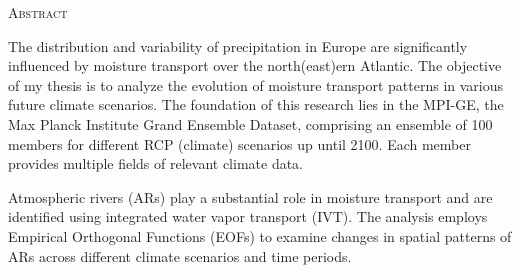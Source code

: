 \begin{center}
  \textsc{Abstract}
\end{center}
%
\noindent
%
The distribution and variability of precipitation in Europe are significantly influenced by moisture transport over the north(east)ern Atlantic. The objective of my thesis is to analyze the evolution of moisture transport patterns in various future climate scenarios. The foundation of this research lies in the MPI-GE, the Max Planck Institute Grand Ensemble Dataset, comprising an ensemble of 100 members for different RCP (climate) scenarios up until 2100. Each member provides multiple fields of relevant climate data.

Atmospheric rivers (ARs) play a substantial role in moisture transport and are identified using integrated water vapor transport (IVT). The analysis employs Empirical Orthogonal Functions (EOFs) to examine changes in spatial patterns of ARs across different climate scenarios and time periods.

